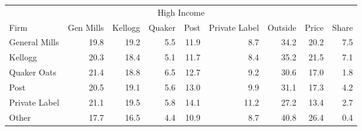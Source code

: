 \begin{tabular}{lrrrrrrrr}
\toprule
\multicolumn{9}{c}{High Income}\\
          Firm &  Gen Mills &  Kellogg &  Quaker &  Post &  Private Label &  Outside &  Price &  Share \\
\midrule
 General Mills &       19.8 &     19.2 &     5.5 &  11.9 &            8.7 &     34.2 &   20.2 &    7.5 \\
       Kellogg &       20.3 &     18.4 &     5.1 &  11.7 &            8.4 &     35.2 &   21.5 &    7.1 \\
   Quaker Oats &       21.4 &     18.8 &     6.5 &  12.7 &            9.2 &     30.6 &   17.0 &    1.8 \\
          Post &       20.5 &     19.1 &     5.6 &  13.0 &            9.9 &     31.1 &   17.3 &    4.2 \\
 Private Label &       21.1 &     19.5 &     5.8 &  14.1 &           11.2 &     27.2 &   13.4 &    2.7 \\
         Other &       17.7 &     16.5 &     4.4 &  10.9 &            8.7 &     40.8 &   26.4 &    0.4 \\
\bottomrule
\end{tabular}
